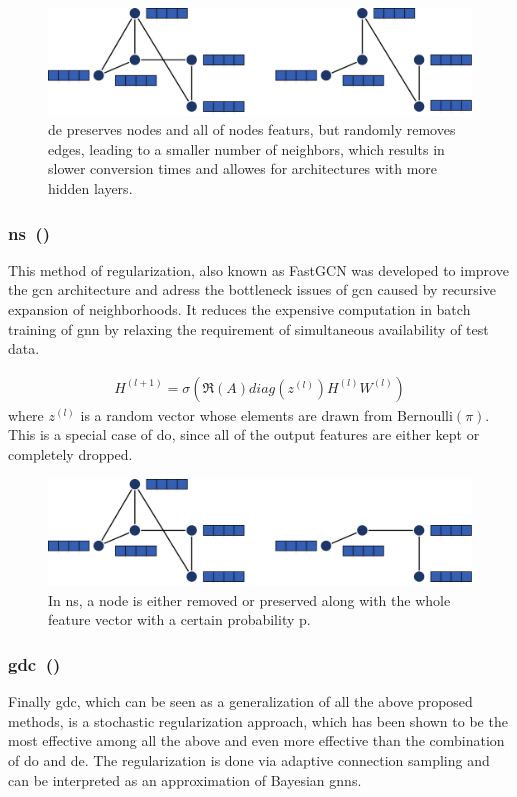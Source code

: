 \begin{figure}[ht]
    \centering
    \includegraphics[width= 0.90\linewidth]{gfx/related-work/DropEdge}
    \caption{\acf{de} preserves nodes and all of nodes featurs, but randomly removes
        edges, leading to a smaller number of neighbors, which results in slower conversion
        times and allowes for architectures with more hidden layers.}\label{fig:related:DropEdge}
\end{figure}
\subsubsection{\acl*{ns}~(\citeauthor{Chen2018})}
\label{sec:related:pred:regularization:ns}

This method of regularization, also known as FastGCN was
developed to improve the \ac{gcn}\cite{Kipf2017} architecture and adress the bottleneck issues
of \ac{gcn} caused by recursive expansion of neighborhoods.
It reduces the expensive computation in batch training of \ac{gnn} by relaxing the
requirement of simultaneous availability of test data.

\begin{align*}
    H^{(l+1)} = \sigma (\mathfrak{R}(A) diag(z^{(l)}) H^{(l)} W^{(l)})
\end{align*}
where $z^{(l)}$ is a random vector whose elements are drawn from Bernoulli$(\pi)$.
This is a special case of \ac{do}, since all of the output features are either kept or
completely dropped.
\begin{figure}[ht]
    \centering
    \includegraphics[width= 0.90\linewidth]{gfx/related-work/NodeSampling}
    \caption{In \acf{ns}, a node is either removed or preserved along with the whole feature
        vector with a certain probability p.}\label{fig:related:NodeSampling}
\end{figure}
\subsubsection{\acl*{gdc}~(\citeauthor{Hasanzadeh2020})}
\label{sec:related:pred:regularization:gdc}
Finally \ac{gdc}, which can be seen as a generalization of all the above proposed methods,
is a stochastic regularization approach, which has been shown to be the most effective among all the above and
even more effective than the combination of \ac{do} and \ac{de}.
The regularization is done via adaptive connection sampling and can be interpreted as an approximation
of Bayesian \acp{gnn}.

